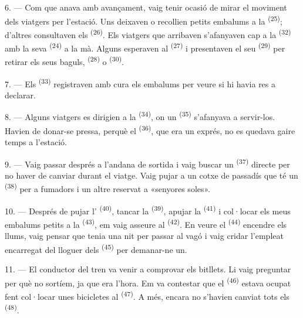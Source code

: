 6. --- Com que anava amb avançament, vaig tenir ocasió de mirar el moviment dels
viatgers per l'estació. Uns deixaven o recollien petits embalums a la
 \textsuperscript{(25)}; d'altres consultaven els 
\textsuperscript{(26)}. Els viatgers que arribaven s'afanyaven cap a la
 \textsuperscript{(32)} amb la seva 
\textsuperscript{(24)} a la mà. Alguns esperaven al  \textsuperscript{(27)} i presentaven el seu 
\textsuperscript{(29)} per retirar els seus baguls, 
\textsuperscript{(28)} o  \textsuperscript{(30)}.

7. --- Els  \textsuperscript{(33)} registraven amb cura
els embalums per veure si hi havia res a declarar.

8. --- Alguns viatgers es dirigien a la  \textsuperscript{(34)}, on un
 \textsuperscript{(35)} s'afanyava a servir-los. Havien de
donar-se pressa, perquè el  \textsuperscript{(36)}, que era un exprés,
no es quedava gaire temps a l'estació.

9. --- Vaig passar després a l'andana de sortida i vaig buscar un 
\textsuperscript{(37)} directe per no haver de canviar durant el viatge. Vaig
pujar a un cotxe de passadís que té un 
\textsuperscript{(38)} per a fumadors i un altre reservat a «senyores soles».

\VUsaut{3.0mm}

10. --- Després de pujar l' \textsuperscript{(40)}, tancar la
 \textsuperscript{(39)}, apujar la 
\textsuperscript{(41)} i col·locar els meus embalums petits a la 
\textsuperscript{(43)}, em vaig asseure al 
\textsuperscript{(42)}. En veure el  \textsuperscript{(44)}
encendre els llums, vaig pensar que tenia una nit per passar al vagó i vaig
cridar l'empleat encarregat del lloguer dels 
\textsuperscript{(45)} per demanar-ne un.

11. --- El conductor del tren va venir a comprovar els bitllets. Li vaig preguntar
per què no sortíem, ja que era l'hora. Em va contestar que el 
\textsuperscript{(46)} estava ocupat fent col·locar unes bicicletes al
 \textsuperscript{(47)}. A més, encara no s'havien canviat tots els
 \textsuperscript{(48)}.

